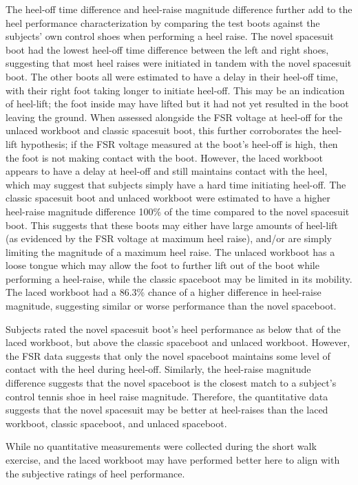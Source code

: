 \documentclass[defaultstyle,11pt]{thesis}
\begin{document}
The heel-off time difference and heel-raise magnitude difference further add to the heel performance characterization by comparing the test boots against the subjects' own control shoes when performing a heel raise.
The novel spacesuit boot had the lowest heel-off time difference between the left and right shoes, suggesting that most heel raises were initiated in tandem with the novel spacesuit boot.
The other boots all were estimated to have a delay in their heel-off time, with their right foot taking longer to initiate heel-off.
This may be an indication of heel-lift; the foot inside may have lifted but it had not yet resulted in the boot leaving the ground.
When assessed alongside the FSR voltage at heel-off for the unlaced workboot and classic spacesuit boot, this further corroborates the heel-lift hypothesis; if the FSR voltage measured at the boot's heel-off is high, then the foot is not making contact with the boot.
However, the laced workboot appears to have a delay at heel-off and still maintains contact with the heel, which may suggest that subjects simply have a hard time initiating heel-off.
The classic spacesuit boot and unlaced workboot were estimated to have a higher heel-raise magnitude difference 100\% of the time compared to the novel spacesuit boot.
This suggests that these boots may either have large amounts of heel-lift (as evidenced by the FSR voltage at maximum heel raise), and/or are simply limiting the magnitude of a maximum heel raise.
The unlaced workboot has a loose tongue which may allow the foot to further lift out of the boot while performing a heel-raise, while the classic spaceboot may be limited in its mobility.
The laced workboot had a 86.3\% chance of a higher difference in heel-raise magnitude, suggesting similar or worse performance than the novel spaceboot.

Subjects rated the novel spacesuit boot's heel performance as below that of the laced workboot, but above the classic spaceboot and unlaced workboot.
However, the FSR data suggests that only the novel spaceboot maintains some level of contact with the heel during heel-off.
Similarly, the heel-raise magnitude difference suggests that the novel spaceboot is the closest match to a subject's control tennis shoe in heel raise magnitude.
Therefore, the quantitative data suggests that the novel spacesuit may be better at heel-raises than the laced workboot, classic spaceboot, and unlaced spaceboot.

While no quantitative measurements were collected during the short walk exercise, and the laced workboot may have performed better here to align with the subjective ratings of heel performance.
\end{document}
